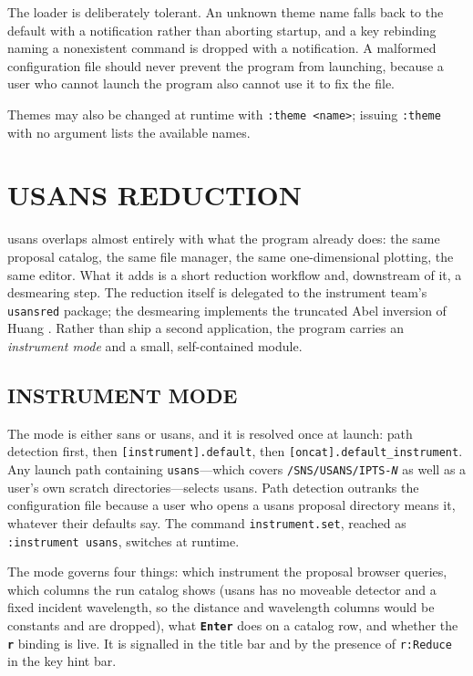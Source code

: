 \documentclass[tm]{ornltm}
\newcommand{\key}[1]{\textbf{\texttt{#1}}}
\begin{document}
The loader is deliberately tolerant. An unknown theme name falls back to the
default with a notification rather than aborting startup, and a key rebinding
naming a nonexistent command is dropped with a notification. A malformed
configuration file should never prevent the program from launching, because a
user who cannot launch the program also cannot use it to fix the file.

Themes may also be changed at runtime with \texttt{:theme <name>}; issuing
\texttt{:theme} with no argument lists the available names.

\section{USANS REDUCTION}
\label{sec:usans}

\Ac{usans} overlaps almost entirely with what the program already does: the same
proposal catalog, the same file manager, the same one-dimensional plotting, the
same editor. What it adds is a short reduction workflow and, downstream of it, a
desmearing step. The reduction itself is delegated to the instrument team's
\texttt{usansred} package; the desmearing implements the truncated Abel inversion
of Huang \autocite{huang2026abel}. Rather than ship a second application, the
program carries an \emph{instrument mode} and a small, self-contained module.

\subsection{INSTRUMENT MODE}

The mode is either \ac{sans} or \ac{usans}, and it is resolved once at launch:
path detection first, then \texttt{[instrument].default}, then
\texttt{[oncat].default\_instrument}. Any launch path containing
\texttt{usans}---which covers \texttt{/SNS/USANS/IPTS-\textit{N}} as well as a
user's own scratch directories---selects \ac{usans}. Path detection outranks the
configuration file because a user who opens a \ac{usans} proposal directory means
it, whatever their defaults say. The command \texttt{instrument.set}, reached as
\texttt{:instrument usans}, switches at runtime.

The mode governs four things: which instrument the proposal browser queries,
which columns the run catalog shows (\ac{usans} has no moveable detector and a
fixed incident wavelength, so the distance and wavelength columns would be
constants and are dropped), what \key{Enter} does on a catalog row, and whether
the \key{r} binding is live. It is signalled in the title bar and by the presence
of \texttt{r:Reduce} in the key hint bar.
\end{document}
